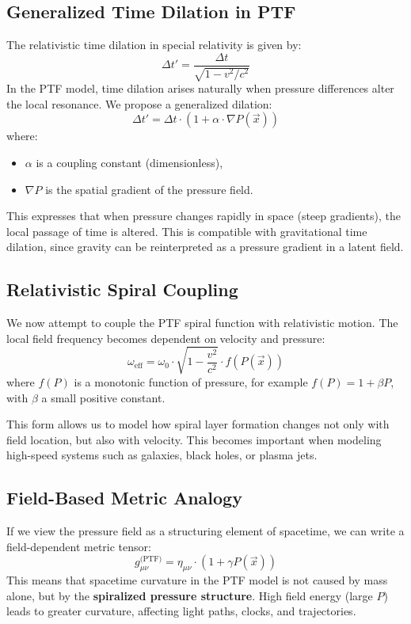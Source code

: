 \documentclass[a4paper,12pt]{article}
\begin{document}
\subsection{Generalized Time Dilation in PTF}

The relativistic time dilation in special relativity is given by:
\[
\Delta t' = \frac{\Delta t}{\sqrt{1 - v^2/c^2}}
\]
In the PTF model, time dilation arises naturally when pressure differences alter the local resonance. We propose a generalized dilation:
\[
\Delta t' = \Delta t \cdot \left(1 + \alpha \cdot \nabla P(\vec{x})\right)
\]
where:
\begin{itemize}
    \item \(\alpha\) is a coupling constant (dimensionless),
    \item \(\nabla P\) is the spatial gradient of the pressure field.
\end{itemize}

This expresses that when pressure changes rapidly in space (steep gradients), the local passage of time is altered. This is compatible with gravitational time dilation, since gravity can be reinterpreted as a pressure gradient in a latent field.

\subsection{Relativistic Spiral Coupling}

We now attempt to couple the PTF spiral function with relativistic motion. The local field frequency becomes dependent on velocity and pressure:
\[
\omega_{\text{eff}} = \omega_0 \cdot \sqrt{1 - \frac{v^2}{c^2}} \cdot f(P(\vec{x}))
\]
where \(f(P)\) is a monotonic function of pressure, for example \(f(P) = 1 + \beta P\), with \(\beta\) a small positive constant.

This form allows us to model how spiral layer formation changes not only with field location, but also with velocity. This becomes important when modeling high-speed systems such as galaxies, black holes, or plasma jets.

\subsection{Field-Based Metric Analogy}

If we view the pressure field as a structuring element of spacetime, we can write a field-dependent metric tensor:
\[
g_{\mu\nu}^{\text{(PTF)}} = \eta_{\mu\nu} \cdot \left(1 + \gamma P(\vec{x})\right)
\]
This means that spacetime curvature in the PTF model is not caused by mass alone, but by the \textbf{spiralized pressure structure}. High field energy (large \(P\)) leads to greater curvature, affecting light paths, clocks, and trajectories.
\end{document}
